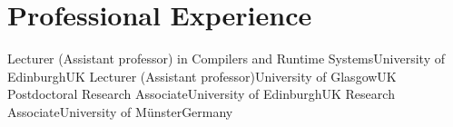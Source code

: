 \section{Professional Experience}
        {Lecturer ({\small Assistant professor}) in Compilers and Runtime Systems}{\newline University of Edinburgh}{UK}{}{}
        {Lecturer ({\small Assistant professor})}{University of Glasgow}{UK}{}{}
        {Postdoctoral Research Associate}{University of Edinburgh}{UK}{}{}
        {Research Associate}{University of Münster}{Germany}{}{}
